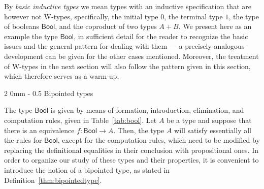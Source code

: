 \documentclass[reqno,10pt,a4paper,oneside]{amsart}
\makeatletter
\numberwithin{equation}{section}
\renewcommand{\subsection}{\@startsection
  {subsection}%
  {2}%
  {0mm}%
  {-\baselineskip}%
  {0.5\baselineskip}%
  {\normalfont\normalsize\bf}}%
\theoremstyle{mythm}
\theoremstyle{mydef}
\theoremstyle{myrmk}
\newcommand{\co}{\colon}
\newcommand{\Bool}{\mathsf{Bool}}
\makeatother
\begin{document}
By \emph{basic inductive types} we mean types with an inductive specification that are however not W-types, specifically, the initial type $0$, the terminal type $1$, the type of booleans $\Bool$, and the coproduct of two types $A + B$.  We present here as an example the type $\Bool$, in sufficient detail for the reader to recognize the basic issues and the general pattern for dealing with them --- a precisely analogous development can be given for the other cases mentioned.  Moreover, the treatment of W-types in the next section will also follow the pattern given in this section, which therefore serves as a warm-up.

\subsection{Bipointed types}
\label{subsection:bool}


The type $\Bool$ is given by means of formation, introduction, elimination, and computation rules, given in Table~\ref{tab:bool}. Let $A$ be a type and suppose that there is an equivalence $f \co \Bool \to A$. Then, the type $A$ will satisfy essentially all the rules for $\Bool$,
except for the computation rules, which need to be modified by replacing the definitional equalities in their conclusion with propositional ones. 
In order to organize our study of these types and their properties, it is convenient to introduce the notion of a bipointed type, as stated in
Definition~\ref{thm:bipointedtype}.
\end{document}
